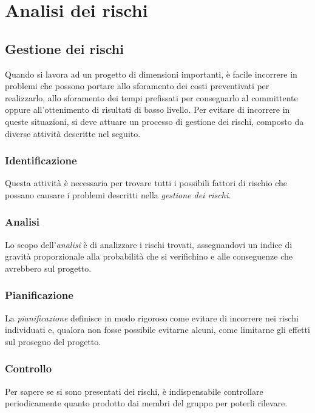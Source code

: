 \section{Analisi dei rischi}
	\subsection{Gestione dei rischi}
    Quando si lavora ad un progetto di dimensioni importanti, è facile incorrere in problemi che possono portare allo sforamento dei costi preventivati per realizzarlo, allo sforamento dei tempi prefissati per consegnarlo al committente oppure all'ottenimento di risultati di basso livello. \newline
    Per evitare di incorrere in queste situazioni, si deve attuare un processo di gestione dei rischi, composto da diverse attività descritte nel seguito.

	\subsubsection{Identificazione}
    Questa attività è necessaria per trovare tutti i possibili fattori di rischio che possano causare i problemi descritti nella \textit{gestione dei rischi}. 

	\subsubsection{Analisi}
	Lo scopo dell'\textit{analisi} è di analizzare i rischi trovati, assegnandovi un indice di gravità proporzionale alla probabilità che si verifichino e alle conseguenze che avrebbero sul progetto.

	\subsubsection{Pianificazione}
    La \textit{pianificazione} definisce in modo rigoroso come evitare di incorrere nei rischi individuati e, qualora non fosse possibile evitarne alcuni, come limitarne gli effetti sul proseguo del progetto.

	\subsubsection{Controllo} 
    Per sapere se si sono presentati dei rischi, è indispensabile controllare periodicamente quanto prodotto dai membri del gruppo per poterli rilevare.

	\newpage %
		
